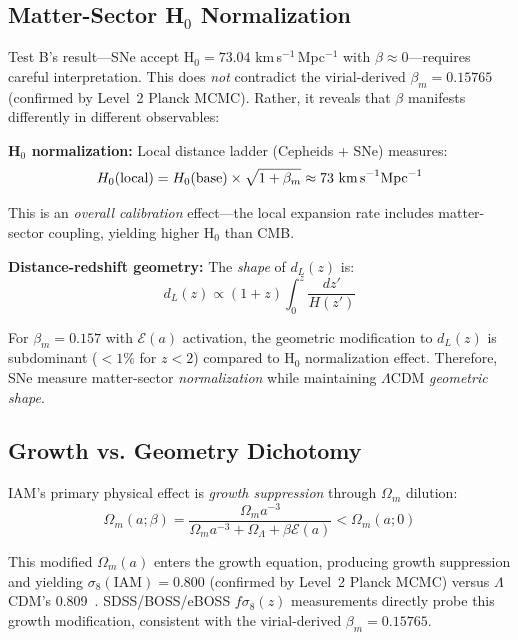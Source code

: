 \documentclass[twocolumn,superscriptaddress,prd,amsmath,amssymb]{revtex4-2}
\begin{document}
\subsection{Matter-Sector H$_0$ Normalization}

Test B's result---SNe accept H$_0 = 73.04$ km\,s$^{-1}$\,Mpc$^{-1}$ with $\beta \approx 0$---requires careful interpretation. This does \textit{not} contradict the virial-derived $\beta_m = 0.15765$ (confirmed by Level~2 Planck MCMC). Rather, it reveals that $\beta$ manifests differently in different observables:

\textbf{H$_0$ normalization:} Local distance ladder (Cepheids + SNe) measures:
\begin{equation}
H_0(\text{local}) = H_0(\text{base}) \times \sqrt{1 + \beta_m} \approx 73 \text{ km\,s}^{-1}\text{Mpc}^{-1}
\end{equation}

This is an \textit{overall calibration} effect—the local expansion rate includes matter-sector coupling, yielding higher H$_0$ than CMB.

\textbf{Distance-redshift geometry:} The \textit{shape} of $d_L(z)$ is:
\begin{equation}
d_L(z) \propto (1+z)\int_0^z \frac{dz'}{H(z')}
\end{equation}

For $\beta_m = 0.157$ with $\mathcal{E}(a)$ activation, the geometric modification to $d_L(z)$ is subdominant ($<1\%$ for $z < 2$) compared to H$_0$ normalization effect. Therefore, SNe measure matter-sector \textit{normalization} while maintaining $\Lambda$CDM \textit{geometric shape}.

\subsection{Growth vs. Geometry Dichotomy}

IAM's primary physical effect is \textit{growth suppression} through $\Omega_m$ dilution:
\begin{equation}
\Omega_m(a;\beta) = \frac{\Omega_m a^{-3}}{\Omega_m a^{-3} + \Omega_\Lambda + \beta\mathcal{E}(a)} < \Omega_m(a;0)
\end{equation}

This modified $\Omega_m(a)$ enters the growth equation, producing growth suppression and yielding $\sigma_8(\text{IAM}) = 0.800$ (confirmed by Level~2 Planck MCMC) versus $\Lambda$CDM's 0.809~\cite{IAMCompendium2025}. SDSS/BOSS/eBOSS $f\sigma_8(z)$ measurements directly probe this growth modification, consistent with the virial-derived $\beta_m = 0.15765$.
\end{document}
